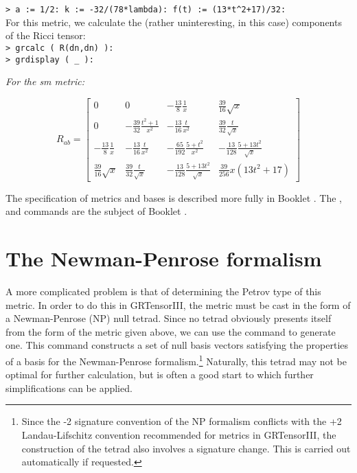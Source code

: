 \documentclass{article}
\begin{document}
{\noindent\texttt{> a := 1/2: k := -32/(78*lambda):
  f(t) := (13*t\^{}2+17)/32:}\\

\noindent For this metric, we calculate the
(rather uninteresting, in this case) components of the Ricci tensor:\\

\noindent\texttt{> grcalc ( R(dn,dn) ):}\\
\noindent\texttt{> grdisplay ( \_ ):}
\begin{center}{\em For the sm metric:}\end{center}
\[
  R_{ab} = \left[
    \begin{array}{cccc}
      0 & 0 & -\frac{13}{8}\frac{1}{x} & \frac{39}{16}\sqrt{x} \\
      0 & - \frac{39}{32}\frac{t^2+1}{x^2} & -\frac{13}{16}\frac{t}{x^2} &
        \frac{39}{32}\frac{t}{\sqrt{x}} \\
        -\frac{13}{8}\frac{1}{x} & -\frac{13}{16}\frac{t}{x^2} &
      -\frac{65}{192}\frac{5+t^2}{x^2} & 
        -\frac{13}{128}\frac{5+13t^2}{\sqrt{x}} \\
      \frac{39}{16}\sqrt{x} & \frac{39}{32}\frac{t}{\sqrt{x}} &
        -\frac{13}{128}\frac{5+13t^2}{\sqrt{x}} &
        \frac{39}{256}x(13t^2+17)
    \end{array}
    \right]
\]

The specification of metrics and bases is described more fully in Booklet
\grMakegRef. The ,  and 
commands are the subject of Booklet \grCalcRef.
%
\section{The Newman-Penrose formalism}
A more complicated problem is that of determining the Petrov type of
this metric. In order to do this in GRTensorIII, the metric must be
cast in the form of a Newman-Penrose (NP) null tetrad. Since no tetrad
obviously presents itself from the form of the metric given above, we
can use the command  to generate one. This command
constructs a set of null basis vectors satisfying the properties of
a basis for the Newman-Penrose formalism.\footnote{Since the -2 signature
convention of the NP formalism conflicts with the +2 Landau-Lifschitz
convention recommended for metrics in GRTensorIII, the construction
of the tetrad also involves a signature change. This is carried out
automatically if requested.}  Naturally, this tetrad
may not be optimal for further calculation, but is often a good start
to which further simplifications can be applied.\\

}
\end{document}
